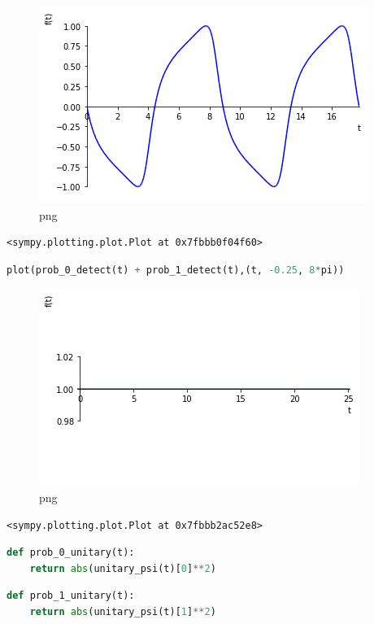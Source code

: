 \begin{figure}
\centering
\includegraphics[width=0.66\linewidth]{output_36_0.png}
\caption{png}
\end{figure}

\begin{lstlisting}
<sympy.plotting.plot.Plot at 0x7fbbb0f04f60>
\end{lstlisting}

\begin{lstlisting}[language=Python]
plot(prob_0_detect(t) + prob_1_detect(t),(t, -0.25, 8*pi))
\end{lstlisting}

\begin{figure}
\centering
\includegraphics[width=0.66\linewidth]{output_37_0.png}
\caption{png}
\end{figure}

\begin{lstlisting}
<sympy.plotting.plot.Plot at 0x7fbbb2ac52e8>
\end{lstlisting}

\begin{lstlisting}[language=Python]
def prob_0_unitary(t):
    return abs(unitary_psi(t)[0]**2)
\end{lstlisting}

\begin{lstlisting}[language=Python]
def prob_1_unitary(t):
    return abs(unitary_psi(t)[1]**2)
\end{lstlisting}

